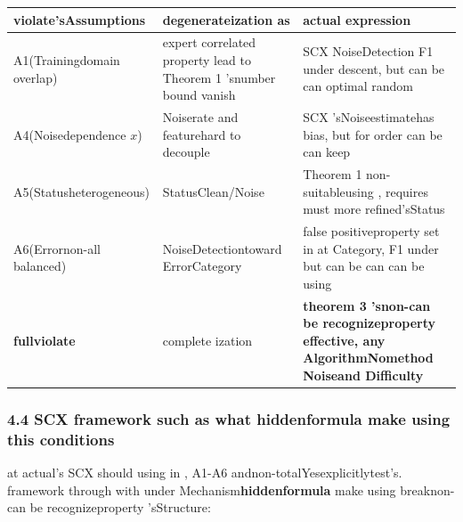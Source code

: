 \documentclass[
  12pt,
]{article}
\begin{document}
\begin{longtable}[]{@{}
  >{\raggedright\arraybackslash}p{}
  >{\raggedright\arraybackslash}p{}
  >{\raggedright\arraybackslash}p{}@{}}
\toprule\noalign{}
\begin{minipage}[b]{\linewidth}\raggedright
violate'sAssumptions
\end{minipage} & \begin{minipage}[b]{\linewidth}\raggedright
degenerateization as 
\end{minipage} & \begin{minipage}[b]{\linewidth}\raggedright
actual expression
\end{minipage} \\
\midrule\noalign{}
\endhead
\bottomrule\noalign{}
\endlastfoot
A1(Trainingdomain overlap) & expert correlated property lead to Theorem 1 'snumber bound vanish & SCX NoiseDetection
F1 under descent, but can be can optimal random \\
A4(Noisedependence \(x\)) & Noiserate and featurehard to decouple & SCX
'sNoiseestimatehas bias, but for order can be can keep \\
A5(Statusheterogeneous) & StatusClean/Noise & Theorem 1
non-suitableusing , requires must more refined'sStatus \\
A6(Errornon-all balanced) & NoiseDetectiontoward ErrorCategory & false positiveproperty set in at Category, F1
under but can be can can be using  \\
\textbf{fullviolate} & complete ization  & \textbf{theorem  3
'snon-can be recognizeproperty effective, any AlgorithmNomethod Noiseand Difficulty} \\
\end{longtable}

\subsubsection{4.4 SCX
framework such as what hiddenformula make using this conditions}\label{scx-ux6846ux67b6ux5982ux4f55ux9690ux5f0fux4f7fux7528ux8fd9ux4e9bux6761ux4ef6}

at actual's SCX should using in , A1-A6
andnon-totalYesexplicitlytest's. framework through with under Mechanism\textbf{hiddenformula }make using breaknon-can be recognizeproperty 'sStructure: 
\end{document}
